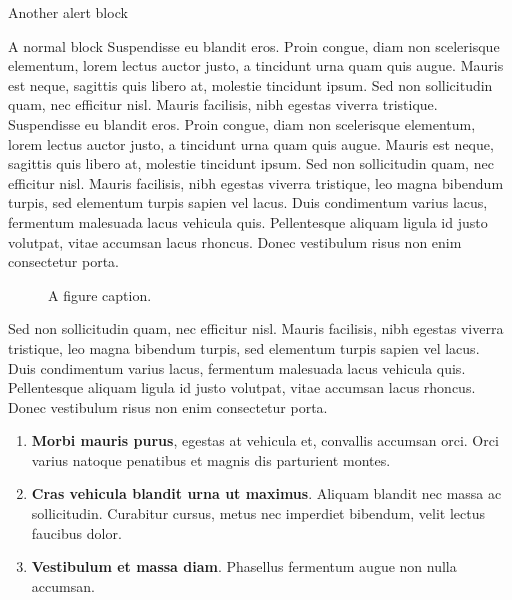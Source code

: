 \documentclass[final]{beamer}
\newlength{\colwidth}
\begin{document}
\begin{frame}[t]
\begin{columns}[t]
\begin{column}{\colwidth}
\begin{alertblock}{Another alert block}
 
  \end{alertblock}
  \begin{block}{A normal block}
  Suspendisse eu blandit eros. Proin congue, diam non scelerisque elementum, lorem lectus auctor justo, a tincidunt urna quam quis augue. Mauris est neque, sagittis quis libero at, molestie tincidunt ipsum. Sed non sollicitudin quam, nec efficitur nisl. Mauris facilisis, nibh egestas viverra tristique.
  Suspendisse eu blandit eros. Proin congue, diam non scelerisque elementum, lorem lectus auctor justo, a tincidunt urna quam quis augue. Mauris est neque, sagittis quis libero at, molestie tincidunt ipsum. Sed non sollicitudin quam, nec efficitur nisl. Mauris facilisis, nibh egestas viverra tristique, leo magna bibendum turpis, sed elementum turpis sapien vel lacus. Duis condimentum varius lacus, fermentum malesuada lacus vehicula quis. Pellentesque aliquam ligula id justo volutpat, vitae accumsan lacus rhoncus. Donec vestibulum risus non enim consectetur porta. 
  
    \begin{figure}
        \centering
{}
        \caption{A figure caption.}
        \label{fig:my_label}
    \end{figure}
Sed non sollicitudin quam, nec efficitur nisl. Mauris facilisis, nibh egestas viverra tristique, leo magna bibendum turpis, sed elementum turpis sapien vel lacus. Duis condimentum varius lacus, fermentum malesuada lacus vehicula quis. Pellentesque aliquam ligula id justo volutpat, vitae accumsan lacus rhoncus. Donec vestibulum risus non enim consectetur porta. 
    \begin{enumerate}
      \item \textbf{Morbi mauris purus}, egestas at vehicula et, convallis
        accumsan orci. Orci varius natoque penatibus et magnis dis parturient
        montes.
      \item \textbf{Cras vehicula blandit urna ut maximus}. Aliquam blandit nec
        massa ac sollicitudin. Curabitur cursus, metus nec imperdiet bibendum,
        velit lectus faucibus dolor.
      \item \textbf{Vestibulum et massa diam}. Phasellus fermentum augue non
        nulla accumsan.
    \end{enumerate}


\end{block}
\end{column}
\end{columns}
\end{frame}
\end{document}
